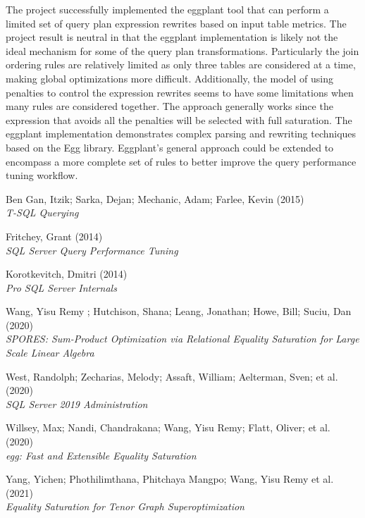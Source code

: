 \documentclass{article}
\begin{document}
The project successfully implemented the eggplant tool that can perform a limited set of query
plan expression rewrites based on input table metrics.  The project result is neutral in that the eggplant implementation 
is likely not the ideal mechanism for some of the query plan transformations.  Particularly the join ordering 
rules are relatively limited as only three tables are considered at a time, making global optimizations more
difficult.  Additionally, the model of using penalties to control the expression rewrites seems to have some limitations
when many rules are considered together.  The approach generally works since the expression that avoids all the penalties
will be selected with full saturation.  The eggplant implementation demonstrates complex parsing and rewriting techniques based on the Egg library.  
Eggplant's general approach could be extended to encompass a more complete set of rules to better improve the query performance tuning workflow. 

\begin{thebibliography}{100} %

Ben Gan, Itzik; Sarka, Dejan; Mechanic, Adam; Farlee, Kevin (2015)
\\\newblock \textit{T-SQL Querying}

Fritchey, Grant (2014)
\\\newblock \textit{SQL Server Query Performance Tuning}

Korotkevitch, Dmitri (2014)
\\\newblock \textit{Pro SQL Server Internals}

Wang, Yisu Remy ; Hutchison, Shana; Leang, Jonathan; Howe, Bill; Suciu, Dan (2020)
\\\newblock \textit{SPORES: Sum-Product Optimization via Relational Equality Saturation for Large Scale Linear Algebra}

West, Randolph; Zecharias, Melody; Assaft, William; Aelterman, Sven; et al. (2020)
\\\newblock \textit{SQL Server 2019 Administration}

Willsey, Max; Nandi, Chandrakana; Wang, Yisu Remy; Flatt, Oliver; et al. (2020)
\\\newblock \textit{egg: Fast and Extensible Equality Saturation}

Yang, Yichen; Phothilimthana, Phitchaya Mangpo; Wang, Yisu Remy  et al. (2021)
\\\newblock \textit{Equality Saturation for Tenor Graph Superoptimization}

\end{thebibliography}
\end{document}
